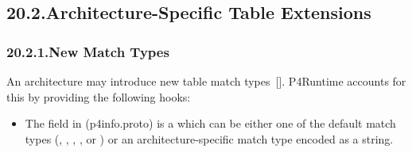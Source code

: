 \documentclass[11pt]{article}
\begin{document}
{%
\subsection{20.2.\hspace*{0.5em}Architecture-Specific Table Extensions}\label{sec-architecture-specific-table-extensions}%

\subsubsection{20.2.1.\hspace*{0.5em}New Match Types}\label{sec-new-match-types}%

\noindent{}An architecture may introduce new table match types~[]. P4Runtime
accounts for this by providing the following hooks:%

\begin{itemize}%

\item{}
The  field in  (p4info.proto) is a 
which can be either one of the default match types (, , ,
, or ) or an architecture-specific match type encoded as a
string.%


\end{itemize}}
\end{document}
